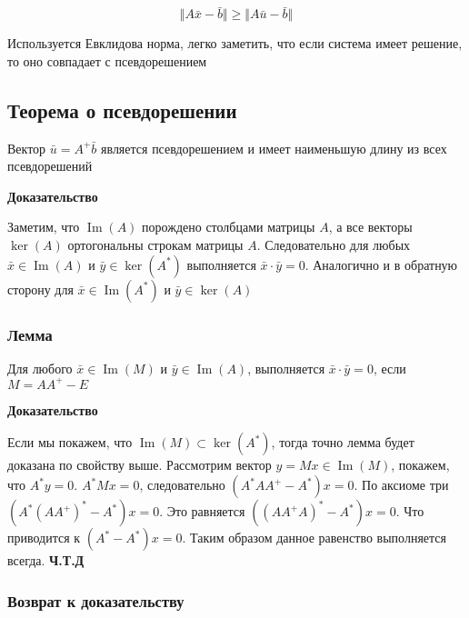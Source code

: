 \documentclass{article}
\begin{document}
    \begin{equation}
        \Vert A \bar{x} - \bar{b} \Vert \geq \Vert A \bar{u} - \bar{b} \Vert
    \end{equation}

    Используется Евклидова норма, легко заметить, что если система имеет решение, то оно совпадает с псевдорешением
    
    \subsection{Теорема о псевдорешении}

    Вектор $\bar{u} = A^{+} \bar{b}$ является псевдорешением и 
    имеет наименьшую длину из всех псевдорешений 

    \quad

    \textbf{Доказательство}

    \quad

    Заметим, что $\operatorname{Im}(A)$ порождено столбцами матрицы $A$, а все векторы $\ker(A)$ ортогональны строкам матрицы $A$.
    Следовательно для любых $\bar{x} \in \operatorname{Im}(A)$ и $\bar{y} \in \ker(A^{*})$ выполняется $\bar{x} \cdot \bar{y} = 0$.
    Аналогично и в обратную сторону для $\bar{x} \in \operatorname{Im}(A^{*})$ и $\bar{y} \in \ker(A)$

    \subsubsection{Лемма}

    Для любого $\bar{x} \in \operatorname{Im}(M)$ и $\bar{y} \in \operatorname{Im}(A)$,
    выполняется $\bar{x} \cdot \bar{y} = 0$, если $M = A A^{+} - E$


    \quad

    \textbf{Доказательство}

    \quad

    Если мы покажем, что $\operatorname{Im}(M) \subset \ker(A^{*})$,
    тогда точно лемма будет доказана по свойству выше.
    Рассмотрим вектор $y = Mx \in \operatorname{Im}(M)$, покажем, что $A^{*}y = 0$.
    $A^{*}Mx = 0$, следовательно $(A^{*} A A^{+} - A^{*}) x = 0$.
    По аксиоме три $(A^{*} (A A^{+})^{*} - A^{*}) x = 0$.
    Это равняется $((A A^{+} A)^{*} - A^{*}) x = 0$.
    Что приводится к $( A^{*} - A^{*}) x = 0$.
    Таким образом данное равенство выполняется всегда. \textbf{Ч.Т.Д}


    \subsubsection{Возврат к доказательству}
\end{document}
